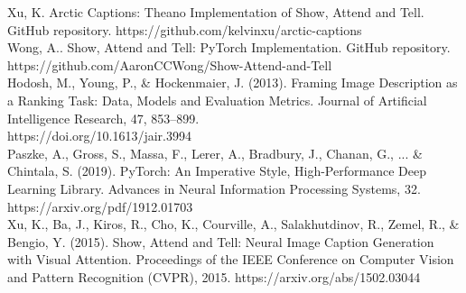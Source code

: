 \documentclass{article}
\begin{document}
\noindent
[2] Xu, K. Arctic Captions: Theano Implementation of Show, Attend and Tell. GitHub repository. https://github.com/kelvinxu/arctic-captions\\

\noindent
[3] Wong, A.. Show, Attend and Tell: PyTorch Implementation. GitHub repository. \\ https://github.com/AaronCCWong/Show-Attend-and-Tell\\

\noindent
[4] Hodosh, M., Young, P., \& Hockenmaier, J. (2013). Framing Image Description as a Ranking Task: Data, Models and Evaluation Metrics. Journal of Artificial Intelligence Research, 47, 853–899.\\ https://doi.org/10.1613/jair.3994\\

\noindent
[5] Paszke, A., Gross, S., Massa, F., Lerer, A., Bradbury, J., Chanan, G., ... \& Chintala, S. (2019). PyTorch: An Imperative Style, High-Performance Deep Learning Library. Advances in Neural Information Processing Systems, 32. \\ https://arxiv.org/pdf/1912.01703\\

\noindent
[6] Xu, K., Ba, J., Kiros, R., Cho, K., Courville, A., Salakhutdinov, R., Zemel, R., \& Bengio, Y. (2015). Show, Attend and Tell: Neural Image Caption Generation with Visual Attention. Proceedings of the IEEE Conference on Computer Vision and Pattern Recognition (CVPR), 2015.
https://arxiv.org/abs/1502.03044
\end{document}
